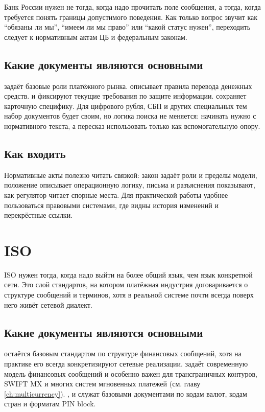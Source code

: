 Банк России нужен не тогда, когда надо прочитать поле сообщения,
а тогда, когда требуется понять границы допустимого поведения.
Как только вопрос звучит как \enquote{обязаны ли мы},
\enquote{имеем ли мы право} или \enquote{какой статус нужен},
переходить следует к нормативным актам ЦБ и федеральным законам.

\subsection*{Какие документы являются основными}

 задаёт базовые роли платёжного рынка.
 описывает правила перевода денежных средств.
 и  фиксируют текущие требования по защите
информации.  сохраняет карточную специфику.
Для цифрового рубля, СБП и других специальных тем набор документов
будет своим, но логика поиска не меняется: начинать нужно
с нормативного текста, а пересказ использовать только
как вспомогательную опору.

\subsection*{Как входить}

Нормативные акты полезно читать связкой: закон задаёт роли
и пределы модели, положение описывает операционную логику,
письма и разъяснения показывают, как регулятор читает спорные
места. Для практической работы удобнее пользоваться правовыми
системами, где видны история изменений и перекрёстные ссылки.

\section{ISO}
\label{sec:ps-iso}

ISO нужен тогда, когда надо выйти на более общий язык, чем язык
конкретной сети. Это слой стандартов, на котором платёжная
индустрия договаривается о структуре сообщений и терминов, хотя
в реальной системе почти всегда поверх него живёт сетевой
диалект.

\subsection*{Какие документы являются основными}

 остаётся базовым стандартом по структуре финансовых
сообщений, хотя на практике его всегда конкретизируют сетевые
реализации.  задаёт современную модель финансовых
сообщений и особенно важен для трансграничных контуров, SWIFT MX
и многих систем мгновенных платежей
(см. главу \ref{ch:multicurrency}). , 
и  служат базовыми документами по кодам валют,
кодам стран и форматам PIN block.

